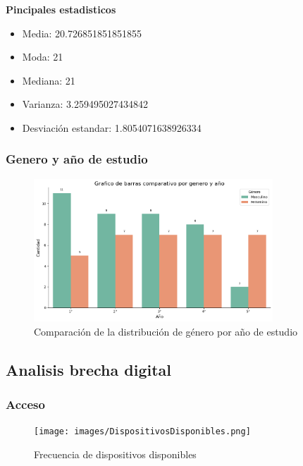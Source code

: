 \documentclass[12pt, a4paper]{article}
\begin{document}
\textbf{Pincipales estadisticos}

\begin{itemize}
    \item Media: 20.726851851851855
    \item Moda: 21
    \item Mediana: 21
    \item Varianza: 3.259495027434842
    \item Desviación estandar: 1.8054071638926334
\end{itemize}

\subsubsection{Genero y año de estudio}

\begin{figure}[H]
    \begin{center}
        \includegraphics[width=0.80\textwidth]{images/GeneroPorAño.png}
    \end{center}
    \label{fig:GeneroPorAño}
    \caption{Comparación de la distribución de género por año de estudio}
\end{figure}

\subsection{Analisis brecha digital}

\subsubsection{Acceso}

\begin{figure}[H]
    \begin{center}
        \texttt{[image: images/DispositivosDisponibles.png]}
    \end{center}
    \label{fig:DispositivosDisponibles}
    \caption{Frecuencia de dispositivos disponibles}
\end{figure}
\end{document}
